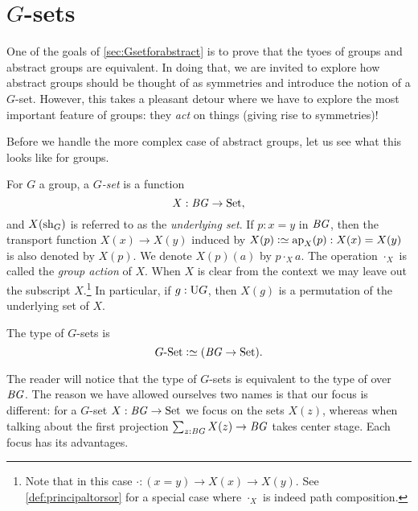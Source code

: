 \section{$G$-sets}
\label{sec:gsets}

One of the goals of \cref{sec:Gsetforabstract} is to prove that the tyoes of groups and abstract groups are equivalent.
In doing that, we are invited to explore how abstract groups should be thought of as symmetries and introduce the notion of a $G$-set.
However, this takes a pleasant detour where we have to explore the most important feature of groups: they \emph{act} on things (giving rise to symmetries)!

Before we handle the more complex case of abstract groups,
let us see what this looks like for groups.

\begin{definition}
  For $G$ a group, a \emph{$G$-set} is a function
  $$X : \mathit{B}\mathit{G}\to\mathrm{Set},$$
and $X(\mathrm{sh}_G)$ is referred to as the \emph{underlying set}.
If $p:x=y$ in $\mathit{B}\mathit{G}$, then the transport function $X(x)\to X(y)$ induced
by $X(p)\defeq\ap{X}(p) : X(x)=X(y)$ is also denoted by $X(p)$.
We denote $X(p)(a)$ by $p\cdot_X a$.
The operation $\cdot_X$ is called the \emph{group action} of $X$.
When $X$ is clear from the context we may leave out the
subscript $X$.\footnote{%
Note that in this case $\cdot: (x=y)\to X(x) \to X(y)$.
See \cref{def:principaltorsor} for a special case
where $\cdot_X$ is indeed path composition.}
In particular, if $g:\mathrm{U} G$,
then $X(g)$ is a permutation of the underlying set of $X$.

The type of $G$-sets is $$\GSet\defequi(\BG\to\Set).$$
\end{definition}
\begin{remark}
  The reader will notice that the type of $G$-sets is equivalent to the
type of \coverings over $\mathit{B}\mathit{G}$.
The reason we have allowed ourselves two names is that our focus is different: for a $G$-set $X:\mathit{B}\mathit{G}\to\mathrm{Set}$ we focus on the sets $X(z)$, whereas when talking about \coverings the first projection $\sum_{z:\mathit{B}\mathit{G}}X(z)\to \mathit{B}\mathit{G}$ takes center stage.  Each focus has its advantages.
\end{remark}

